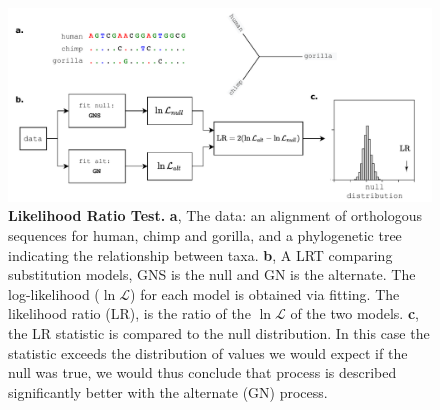 \begin{figure}[htbp]
\centering
\includegraphics[width=\textwidth]{figures/diagrams/LRT.pdf}
\caption[Likelihood Ratio Test]{\textbf{Likelihood Ratio Test.} \textbf{a}, The data: an alignment of orthologous sequences for human, chimp and gorilla, and a phylogenetic tree indicating the relationship between taxa. \textbf{b}, A LRT comparing substitution models, GNS is the null and GN is the alternate. The log-likelihood ($\ln\mathcal{L}$) for each model is obtained via fitting. The likelihood ratio (LR), is the ratio of the $\ln\mathcal{L}$ of the two models. \textbf{c}, the LR statistic is compared to the null distribution. In this case the statistic exceeds the distribution of values we would expect if the null was true, we would thus conclude that process is described significantly better with the alternate (GN) process.}
\label{fig:lrt}
\end{figure}
